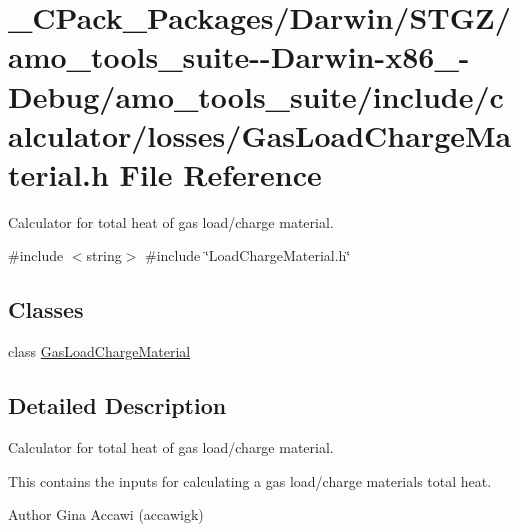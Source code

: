 \hypertarget{___c_pack___packages_2_darwin_2_s_t_g_z_2amo__tools__suite--_darwin-x86__64-_debug_2amo__tools__7b3e8803f2c44210b504e0a3079e71d1}{}\section{\+\_\+\+C\+Pack\+\_\+\+Packages/\+Darwin/\+S\+T\+G\+Z/amo\+\_\+tools\+\_\+suite-\/-\/\+Darwin-\/x86\+\_-\/\+Debug/amo\+\_\+tools\+\_\+suite/include/calculator/losses/\+Gas\+Load\+Charge\+Material.h File Reference}
\label{___c_pack___packages_2_darwin_2_s_t_g_z_2amo__tools__suite--_darwin-x86__64-_debug_2amo__tools__7b3e8803f2c44210b504e0a3079e71d1}


Calculator for total heat of gas load/charge material.  


{\ttfamily \#include $<$string$>$}\newline
{\ttfamily \#include \char`\"{}Load\+Charge\+Material.\+h\char`\"{}}\newline
\subsection*{Classes}
\begin{DoxyCompactItemize}
\item 
class \hyperlink{class_gas_load_charge_material}{Gas\+Load\+Charge\+Material}
\end{DoxyCompactItemize}


\subsection{Detailed Description}
Calculator for total heat of gas load/charge material. 

This contains the inputs for calculating a gas load/charge material\textquotesingle{}s total heat.

\begin{DoxyAuthor}{Author}
Gina Accawi (accawigk) 
\end{DoxyAuthor}
